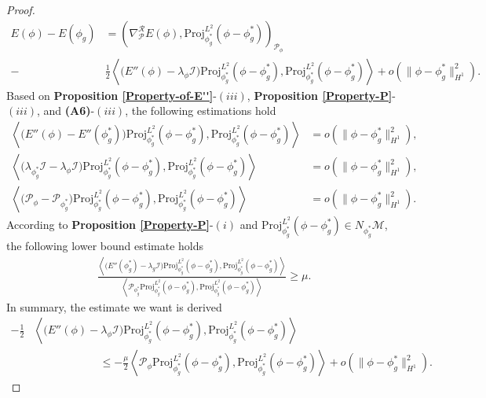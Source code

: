 \documentclass[10pt,a4paper]{amsart}
\begin{document}
\begin{proof}
	\begin{align}\label{P-L2}
		\nonumber E(\phi)-E(\phi_g)&=\left(\nabla^{\mathcal{R}}_{\mathcal{P}} E(\phi),\text{Proj}^{L^2}_{\phi_g^*}(\phi-\phi_g^*)\right)_{\mathcal{P}_{\phi}}\\
		-&\frac{1}{2}\left\langle \big(E''(\phi)-\lambda_{\phi}\mathcal{I}\big)\text{Proj}^{L^2}_{\phi_g^*}(\phi-\phi_g^*),\text{Proj}^{L^2}_{\phi_g^*}(\phi-\phi_g^*)\right\rangle+o\left(\|\phi-\phi_g^*\|^2_{H^1}\right).
	\end{align}
	Based on {\bf Proposition \ref{Property-of-E''}}-$(iii)$, {\bf Proposition \ref{Property-P}}-$(iii)$, and {\bf (A6)}-$(iii)$, the following estimations hold
	\begin{align*}
		\left\langle \big(E''(\phi)-E''(\phi_g^*)\big)\text{Proj}^{L^2}_{\phi_g^*}(\phi-\phi_g^*),\text{Proj}^{L^2}_{\phi_g^*}(\phi-\phi_g^*)\right\rangle&=o\left(\|\phi-\phi_g^*\|^2_{H^1}\right),\\
		\left\langle \big(\lambda_{\phi_g^*}\mathcal{I}-\lambda_{\phi}\mathcal{I}\big)\text{Proj}^{L^2}_{\phi_g^*}(\phi-\phi_g^*),\text{Proj}^{L^2}_{\phi_g^*}(\phi-\phi_g^*)\right\rangle&=o\left(\|\phi-\phi_g^*\|^2_{H^1}\right),\\
		\left\langle\big(\mathcal{P}_{\phi}-\mathcal{P}_{\phi_g^*}\big)\text{Proj}^{L^2}_{\phi_g^*}(\phi-\phi_g^*),\text{Proj}^{L^2}_{\phi_g^*}(\phi-\phi_g^*)\right\rangle&=o\left(\|\phi-\phi_g^*\|^2_{H^1}\right).
	\end{align*}
	According to {\bf Proposition \ref{Property-P}}-$(i)$ and $\text{Proj}^{L^2}_{\phi_g^*}(\phi-\phi_g^*)\in N_{\phi_g^*}\mathcal{M}$, the following lower bound estimate holds
	\begin{align*}
		\frac{\left\langle\big( E''(\phi_g^*)-\lambda_{g}\mathcal{I}\big)\text{Proj}^{L^2}_{\phi_g^*}(\phi-\phi_g^*),\text{Proj}^{L^2}_{\phi_g^*}(\phi-\phi_g^*)\right\rangle}{\left\langle\mathcal{P}_{\phi_g^*}\text{Proj}^{L^2}_{\phi_g^*}(\phi-\phi_g^*),\text{Proj}^{L^2}_{\phi_g^*}(\phi-\phi_g^*)\right\rangle}\ge\mu.
	\end{align*}
	In summary, the estimate we want is derived
	\begin{align*}
		-\frac{1}{2}&\left\langle \big(E''(\phi)-\lambda_{\phi}\mathcal{I}\big)\text{Proj}^{L^2}_{\phi_g^*}(\phi-\phi_g^*),\text{Proj}^{L^2}_{\phi_g^*}(\phi-\phi_g^*)\right\rangle\\
		&\qquad\qquad\qquad\le-\frac{\mu}{2}\left\langle\mathcal{P}_{\phi}\text{Proj}^{L^2}_{\phi_g^*}(\phi-\phi_g^*),\text{Proj}^{L^2}_{\phi_g^*}(\phi-\phi_g^*)\right\rangle
		+o\left(\|\phi-\phi_g^*\|^2_{H^1}\right).

\end{align*}
\end{proof}
\end{document}
